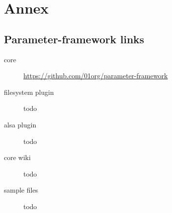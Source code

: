 \chapter*{Annex}\label{chap:annex}

\section*{Parameter-framework links}
\begin{description}
    \item[core] \url{https://github.com/01org/parameter-framework}
    \item[filesystem plugin] todo
    \item[alsa plugin] todo
    \item[core wiki] todo
    \item[sample files] todo
\end{description}
